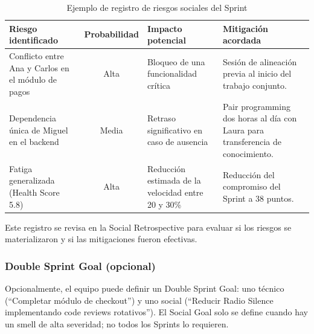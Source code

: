 \begin{table}[h]
    \centering
    \small
    \begin{tabularx}{\textwidth}{|X|c|X|X|}
        \hline
        \textbf{Riesgo identificado} & \textbf{Probabilidad}                                                           & \textbf{Impacto potencial} & \textbf{Mitigación acordada} \\
        \hline
        Conflicto entre Ana y Carlos en el módulo de pagos
                                     & Alta
                                     & Bloqueo de una funcionalidad crítica
                                     & Sesión de alineación previa al inicio del trabajo conjunto.                                                                                 \\
        \hline
        Dependencia única de Miguel en el backend
                                     & Media
                                     & Retraso significativo en caso de ausencia
                                     & Pair programming dos horas al día con Laura para transferencia de conocimiento.                                                             \\
        \hline
        Fatiga generalizada (Health Score 5.8)
                                     & Alta
                                     & Reducción estimada de la velocidad entre 20 y 30\%
                                     & Reducción del compromiso del Sprint a 38 puntos.                                                                                            \\
        \hline
    \end{tabularx}
    \caption{Ejemplo de registro de riesgos sociales del Sprint}
    \label{tab:riesgos-sociales-sprint}
\end{table}

\FloatBarrier

Este registro se revisa en la Social Retrospective para evaluar si los riesgos se materializaron y si las mitigaciones fueron efectivas.

\subsubsection{Double Sprint Goal (opcional)}

Opcionalmente, el equipo puede definir un Double Sprint Goal: uno técnico (``Completar módulo de checkout'') y uno social (``Reducir Radio Silence implementando code reviews rotativos''). El Social Goal solo se define cuando hay un smell de alta severidad; no todos los Sprints lo requieren.

